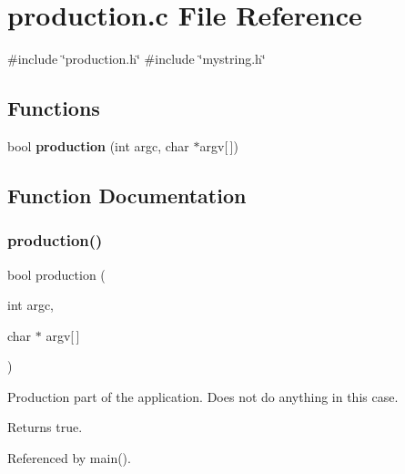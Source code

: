 \section{production.\+c File Reference}
\label{production_8c}
{\ttfamily \#include \char`\"{}production.\+h\char`\"{}}\newline
{\ttfamily \#include \char`\"{}mystring.\+h\char`\"{}}\newline
\subsection*{Functions}
\begin{DoxyCompactItemize}
\item 
bool \textbf{ production} (int argc, char $\ast$argv[$\,$])
\end{DoxyCompactItemize}


\subsection{Function Documentation}
\mbox{\label{production_8c_a9f67b51c42a54745557e7a2c9c07c46f}} 
\subsubsection{production()}
{\footnotesize\ttfamily bool production (\begin{DoxyParamCaption}\item[{int}]{argc,  }\item[{char $\ast$}]{argv[$\,$] }\end{DoxyParamCaption})}

Production part of the application. Does not do anything in this case. \begin{DoxyReturn}{Returns}
true. 
\end{DoxyReturn}


Referenced by main().

